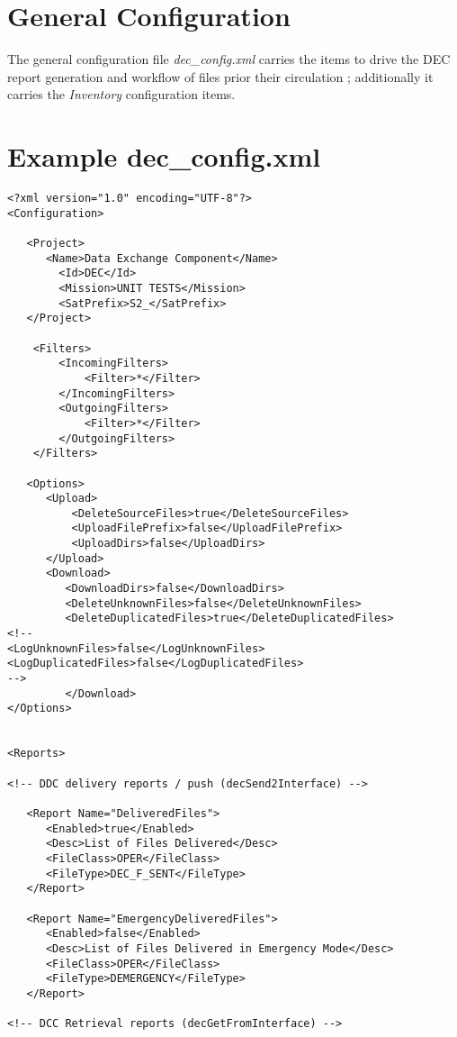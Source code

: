 \documentclass[dec_sum_main.tex]{subfiles}
\begin{document}
\section{General Configuration}
 
\par
\noindent
The general configuration file \textit{dec\_config.xml} carries the items to drive the DEC report generation and workflow of files prior their circulation ; additionally it carries the \textit{Inventory} configuration items.


\label{decconfigxml}
\section{Example dec\_config.xml}
\begin{verbatim}
<?xml version="1.0" encoding="UTF-8"?>
<Configuration>

   <Project>
      <Name>Data Exchange Component</Name>
        <Id>DEC</Id>
        <Mission>UNIT TESTS</Mission>
        <SatPrefix>S2_</SatPrefix>
   </Project>

	<Filters>
		<IncomingFilters>
			<Filter>*</Filter>
		</IncomingFilters>
		<OutgoingFilters>
			<Filter>*</Filter>
		</OutgoingFilters>
	</Filters>

   <Options>
      <Upload>
          <DeleteSourceFiles>true</DeleteSourceFiles>
          <UploadFilePrefix>false</UploadFilePrefix>
          <UploadDirs>false</UploadDirs>
      </Upload>
      <Download>
         <DownloadDirs>false</DownloadDirs>
         <DeleteUnknownFiles>false</DeleteUnknownFiles>
         <DeleteDuplicatedFiles>true</DeleteDuplicatedFiles>
<!--
<LogUnknownFiles>false</LogUnknownFiles>
<LogDuplicatedFiles>false</LogDuplicatedFiles>     
-->    
         </Download>
</Options>


<Reports>

<!-- DDC delivery reports / push (decSend2Interface) -->      

   <Report Name="DeliveredFiles">
      <Enabled>true</Enabled>
      <Desc>List of Files Delivered</Desc>
      <FileClass>OPER</FileClass>
      <FileType>DEC_F_SENT</FileType>
   </Report>

   <Report Name="EmergencyDeliveredFiles">
      <Enabled>false</Enabled>
      <Desc>List of Files Delivered in Emergency Mode</Desc>
      <FileClass>OPER</FileClass>
      <FileType>DEMERGENCY</FileType>
   </Report>

<!-- DCC Retrieval reports (decGetFromInterface) -->


\end{verbatim}
\end{document}
